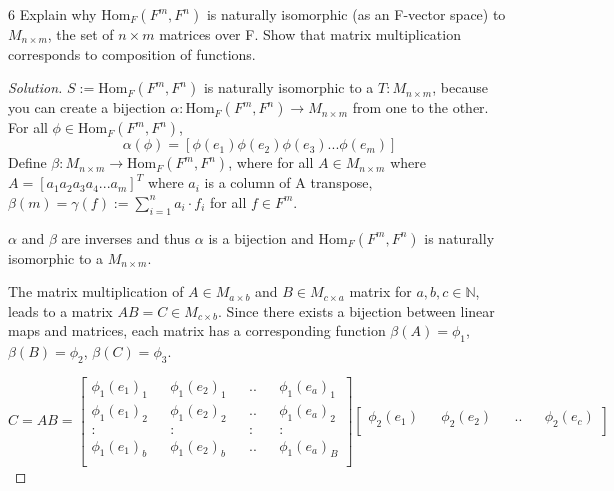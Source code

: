 \documentclass{article}
\newcommand{\N}{\mathbb{N}}
\newcommand{\rarr}[0]{\rightarrow}
\newcommand{\Hom}[0]{\text{Hom}}
\newenvironment{solution}
  {\renewcommand\qedsymbol{$\blacksquare$}\begin{proof}[Solution]}
  {\end{proof}}
\begin{document}
\begin{PROB}{6}\label{Problem 6.}
	Explain why $\Hom_F(F^m,F^n)$ is naturally isomorphic (as an F-vector space) to $M_{n \times m}$, the set of $n \times m$ matrices over F. Show that matrix multiplication corresponds to composition of functions. 
\end{PROB}
\begin{solution}
	$S := \Hom_F(F^m, F^n)$ is naturally isomorphic to a $T: M_{n \times m}$, because you can create a bijection $\alpha: \Hom_F(F^m, F^n) \rarr M_{n \times m}$ from one to the other. For all $\phi \in \Hom_F(F^m, F^n)$, $$\alpha(\phi) = [\phi(e_1)  \phi(e_2) \phi(e_3)... \phi(e_m)]$$ Define $\beta: M_{n \times m} \rarr \Hom_F(F^m, F^n)$, where for all $A \in M_{n \times m}$ where $A = [a_1 a_2 a_3 a_4 ... a_m]^T$ where $a_i$ is a column of A transpose, $ \beta(m)=\gamma(f) := \sum_{i = 1}^{n} a_i \cdot f_i$ for all $f \in F^m$.
	
	
	$\alpha$ and $\beta$ are inverses and thus $\alpha$ is a bijection and $\Hom_F(F^m, F^n)$ is naturally isomorphic to a $M_{n \times m}$.

	The matrix multiplication of $A \in M_{a \times b}$ and $B \in M_{c \times a}$ matrix for $a, b, c \in \N$, leads to a matrix $AB = C \in M_{c \times b}$. Since there exists a bijection between linear maps and matrices, each matrix has a corresponding function $\beta(A) = \phi_1$, $\beta(B) = \phi_2$, $\beta(C) = \phi_3$.

	\begin{equation}
		C = AB = \begin{bmatrix}
			\phi_1(e_{1})_1 && \phi_1(e_{2})_1 && .. && \phi_1(e_{a})_1\\
			\phi_1(e_{1})_2 && \phi_1(e_{2})_2 && .. && \phi_1(e_{a})_2\\
				: && : && : && : \\
			\phi_1(e_{1})_b && \phi_1(e_{2})_b && .. && \phi_1(e_{a})_B\\
		\end{bmatrix}
		\begin{bmatrix}
			\phi_2(e_{1}) && \phi_2(e_{2}) && .. && \phi_2(e_{c})\\
		\end{bmatrix}
	\end{equation}



\end{solution}
\end{document}
